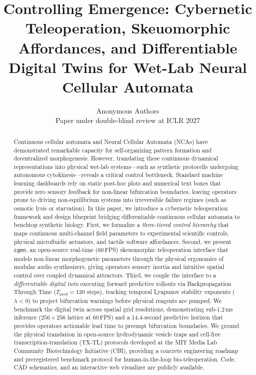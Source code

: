 \documentclass{article}
\title{Controlling Emergence: Cybernetic Teleoperation, Skeuomorphic Affordances, and Differentiable Digital Twins for Wet-Lab Neural Cellular Automata}
\author{Anonymous Authors \\
Paper under double-blind review at ICLR 2027 \\
}
\begin{document}
\maketitle

\begin{abstract}
Continuous cellular automata and Neural Cellular Automata (NCAs) have demonstrated remarkable capacity for self-organizing pattern formation and decentralized morphogenesis. However, translating these continuous dynamical representations into physical wet-lab systems---such as synthetic protocells undergoing autonomous cytokinesis---reveals a critical control bottleneck. Standard machine learning dashboards rely on static post-hoc plots and numerical text boxes that provide zero sensory feedback for non-linear bifurcation boundaries, leaving operators prone to driving non-equilibrium systems into irreversible failure regimes (such as osmotic lysis or starvation). In this paper, we introduce a cybernetic teleoperation framework and design blueprint bridging differentiable continuous cellular automata to benchtop synthetic biology. First, we formalize a \textit{three-tiered control hierarchy} that maps continuous multi-channel field parameters to experimental scientific controls, physical microfluidic actuators, and tactile software affordances. Second, we present \texttt{cgen}, an open-source real-time (60\,FPS) skeuomorphic teleoperation interface that models non-linear morphogenetic parameters through the physical ergonomics of modular audio synthesizers, giving operators sensory inertia and intuitive spatial control over coupled dynamical attractors. Third, we couple the interface to a \textit{differentiable digital twin} executing forward predictive rollouts via Backpropagation Through Time ($T_{\text{pred}} = 120$ steps), tracking temporal Lyapunov stability exponents ($\lambda < 0$) to project bifurcation warnings before physical reagents are pumped. We benchmark the digital twin across spatial grid resolutions, demonstrating sub-1.2\,ms inference ($256 \times 256$ lattice at 60\,FPS) and a 14.4-second predictive horizon that provides operators actionable lead time to preempt bifurcation boundaries. We ground the physical translation in open-source hydrodynamic vesicle traps and cell-free transcription-translation (TX-TL) protocols developed at the MIT Media Lab Community Biotechnology Initiative (CBI), providing a concrete engineering roadmap and preregistered benchmark protocol for human-in-the-loop bio-teleoperation. Code, CAD schematics, and an interactive web visualizer are publicly available.
\end{abstract}
\end{document}
